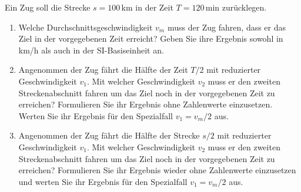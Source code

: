 \begin{ExerciseBlock}
Ein Zug soll die Strecke $s=100 \,$km in der Zeit $T=120 \,$min zurücklegen.

\begin{enumerate}
	\item Welche Durchschnittsgeschwindigkeit $v_m$ muss der Zug fahren, dass er das Ziel in der vorgegebenen Zeit erreicht? Geben Sie ihre Ergebnis sowohl in km/h als auch in der SI-Basiseinheit an.

	\item Angenommen der Zug fährt die Hälfte der Zeit $T/2$ mit reduzierter Geschwindigkeit $v_1$. Mit welcher Geschwindigkeit $v_2$ muss er den zweiten Streckenabschnitt fahren um das Ziel noch in der vorgegebenen Zeit zu erreichen? Formulieren Sie ihr Ergebnis ohne Zahlenwerte einzusetzen. Werten Sie ihr Ergebnis für den Spezialfall $v_1 = v_m/2$ aus.

	\item Angenommen der Zug fährt die Hälfte der Strecke $s/2$ mit reduzierter Geschwindigkeit $v_1$. Mit welcher Geschwindigkeit $v_2$ muss er den zweiten Streckenabschnitt fahren um das Ziel noch in der vorgegebenen Zeit zu erreichen? Formulieren Sie ihr Ergebnis wieder ohne Zahlenwerte einzusetzen und werten Sie ihr Ergebnis für den Spezialfall $v_1 = v_m/2$ aus.

\end{enumerate}
\end{ExerciseBlock}
